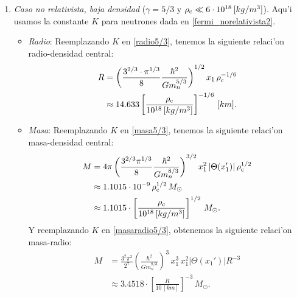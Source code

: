 \begin{enumerate}

\item \emph{Caso no relativista, baja densidad} ($\gamma=5/3$ y $\rho_{\rm c}\ll6\cdot10^{18}\,[kg/m^3]$).
Aqu'i usamos la constante $K$ para neutrones dada en \eqref{fermi_norelativista2}.
\begin{itemize}
 \item \emph{Radio}:
Reemplazando $K$ en \eqref{radio5/3}, tenemos la siguiente relaci'on radio-densidad central:
\begin{align}
R&=\left(\frac{3^{2/3}\cdot\pi^{1/3}}{8}\frac{\hbar^2}{G m_n^{5/3}}\right)^{1/2}x_1\,\rho_{\rm c}^{-1/6}\\
 &\approx14.633\left[\frac{\rho_{\rm c}}{10^{18}\,[kg/m^3]}\right]^{-1/6}\,[km].
\end{align}
\item \emph{Masa}:
Reemplazando $K$ en \eqref{masa5/3}, tenemos la siguiente relaci'on masa-densidad central:
\begin{align}
M&=4\pi\left(\frac{3^{2/3}\pi^{1/3}}{8}\frac{\hbar^2}{G m_n^{8/3}}\right)^{3/2}x_1^2\left|\Theta(x_1')\right|\rho_{\rm c}^{1/2}\\
&\approx1.1015\cdot 10^{-9}\,\rho_{\rm c}^{1/2}\,M_{\odot}\label{neutrones5/3-masadensidad}\\
&\approx1.1015\cdot\left[\frac{\rho_{\rm c}}{10^{18}\,[kg/m^3]}\right]^{1/2}\,M_{\odot}.
\end{align}
Y reemplazando $K$ en \eqref{masaradio5/3}, obtenemos la siguiente relaci'on masa-radio:
\begin{align}
 M&=\frac{3^2\pi^2}{2^7}\left(\frac{\hbar^2}{Gm_n^{8/3}}\right)^3\,x_1^3\,x_1^2\left|\Theta(x_1')\right| R^{-3}\\
&\approx3.4518\cdot\left[\frac{R}{10\,[km]}\right]^{-3}\,M_{\odot}.\label{neutrones5/3-masaradio}
\end{align}

\end{itemize}


\end{enumerate}
